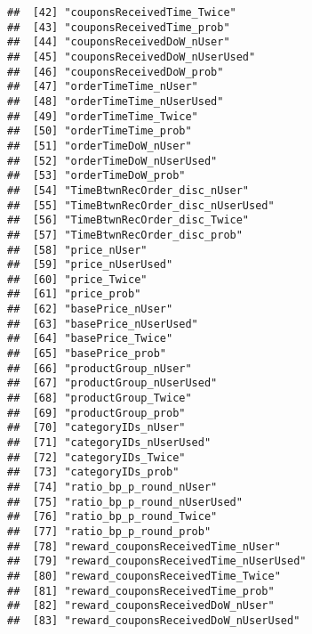 \documentclass[10pt]{report}
\begin{document}
\begin{verbatim}
##  [42] "couponsReceivedTime_Twice"                          
##  [43] "couponsReceivedTime_prob"                           
##  [44] "couponsReceivedDoW_nUser"                           
##  [45] "couponsReceivedDoW_nUserUsed"                       
##  [46] "couponsReceivedDoW_prob"                            
##  [47] "orderTimeTime_nUser"                                
##  [48] "orderTimeTime_nUserUsed"                            
##  [49] "orderTimeTime_Twice"                                
##  [50] "orderTimeTime_prob"                                 
##  [51] "orderTimeDoW_nUser"                                 
##  [52] "orderTimeDoW_nUserUsed"                             
##  [53] "orderTimeDoW_prob"                                  
##  [54] "TimeBtwnRecOrder_disc_nUser"                        
##  [55] "TimeBtwnRecOrder_disc_nUserUsed"                    
##  [56] "TimeBtwnRecOrder_disc_Twice"                        
##  [57] "TimeBtwnRecOrder_disc_prob"                         
##  [58] "price_nUser"                                        
##  [59] "price_nUserUsed"                                    
##  [60] "price_Twice"                                        
##  [61] "price_prob"                                         
##  [62] "basePrice_nUser"                                    
##  [63] "basePrice_nUserUsed"                                
##  [64] "basePrice_Twice"                                    
##  [65] "basePrice_prob"                                     
##  [66] "productGroup_nUser"                                 
##  [67] "productGroup_nUserUsed"                             
##  [68] "productGroup_Twice"                                 
##  [69] "productGroup_prob"                                  
##  [70] "categoryIDs_nUser"                                  
##  [71] "categoryIDs_nUserUsed"                              
##  [72] "categoryIDs_Twice"                                  
##  [73] "categoryIDs_prob"                                   
##  [74] "ratio_bp_p_round_nUser"                             
##  [75] "ratio_bp_p_round_nUserUsed"                         
##  [76] "ratio_bp_p_round_Twice"                             
##  [77] "ratio_bp_p_round_prob"                              
##  [78] "reward_couponsReceivedTime_nUser"                   
##  [79] "reward_couponsReceivedTime_nUserUsed"               
##  [80] "reward_couponsReceivedTime_Twice"                   
##  [81] "reward_couponsReceivedTime_prob"                    
##  [82] "reward_couponsReceivedDoW_nUser"                    
##  [83] "reward_couponsReceivedDoW_nUserUsed"                

\end{verbatim}
\end{document}
